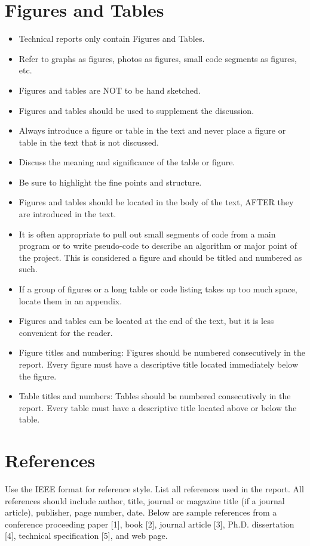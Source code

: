 \documentclass[12pt]{article}
\begin{document}
\section*{Figures and Tables}
\begin{itemize}[noitemsep]
    \item Technical reports only contain Figures and Tables.
    \item Refer to graphs as figures, photos as figures, small code segments as figures, etc.
    \item Figures and tables are NOT to be hand sketched.
    \item Figures and tables should be used to supplement the discussion.
    \item Always introduce a figure or table in the text and never place a figure or table in the text that is not discussed.
    \item Discuss the meaning and significance of the table or figure.
    \item Be sure to highlight the fine points and structure.
    \item Figures and tables should be located in the body of the text, AFTER they are introduced in the text.
    \item It is often appropriate to pull out small segments of code from a main program or to write pseudo-code to describe an algorithm or major point of the project. This is considered a figure and should be titled and numbered as such.
    \item If a group of figures or a long table or code listing takes up too much space, locate them in an appendix.
    \item Figures and tables can be located at the end of the text, but it is less convenient for the reader.
    \item Figure titles and numbering: Figures should be numbered consecutively in the report. Every figure must have a descriptive title located immediately below the figure.
    \item Table titles and numbers: Tables should be numbered consecutively in the report. Every table must have a descriptive title located above or below the table.
\end{itemize}

\section*{References}
Use the IEEE format for reference style. List all references used in the report. All references should include author, title, journal or magazine title (if a journal article), publisher, page number, date. Below are sample references from a conference proceeding paper [1], book [2], journal article [3], Ph.D. dissertation [4], technical specification [5], and web page.
\end{document}
